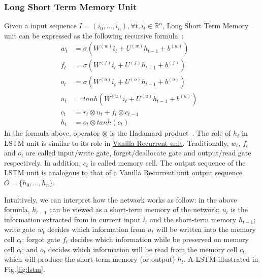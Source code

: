 \subsubsection{Long Short Term Memory Unit}\label{sec:lstm}
Given a input sequence \(I = (i_0,\ldots,i_n), \forall t, i_t \in \mathbb{R}^n\), Long Short Term Memory unit can be expressed as the following recursive formula~\cite{treeLSTM}:
\begin{align}
    w_t &= \sigma(W^{(w)}i_t + U^{(w)}h_{t-1} + b^{(w)}) \label{eq:lstm-input-gate}&\\ 
      f_t &= \sigma(W^{(f)}i_t + U^{(f)}h_{t-1} + b^{(f)}) \label{eq:lstm-forget-gate}&\\ 
      o_t &= \sigma(W^{(o)}i_t + U^{(o)}h_{t-1} + b^{(o)}) \label{eq:lstm-output-gate}&\\ 
      u_t &= tanh(W^{(u)}i_t + U^{(u)}h_{t-1} + b^{(u)}) \label{eq:lstm-update-gate}&\\ 
      c_t &= r_t \otimes u_t + f_t \otimes c_{t-1} \label{eq:longterm-mem}&\\ 
      h_t &= o_t \otimes tanh(c_t) \label{eq:temperal-mem}& 
\end{align}
In the formula above, operator \(\otimes\) is the Hadamard product~\cite{element-prod}.
The role of \(h_t\) in LSTM unit is similar to its role in \hyperref[sec:vanilla-rnn]{Vanilla Recurrent unit}. 
Traditionally, \(w_t\), \(f_t\) and \(o_t\) are called input/write gate, forget/deallocate gate and output/read gate respectively. 
In addition, \(c_t\) is called memory cell. 
The output sequence of the LSTM unit is analogous to that of a Vanilla Recurrent unit output sequence \(O = \{h_0,\ldots,h_n\}\).

Intuitively, we can interpret how the network works as follow: in the above formula, \(h_{t-1}\) can be viewed as a short-term memory of the network; \(u_t\) is the information extracted from in current input \(i_t\) and the short-term memory \(h_{t-1}\); write gate \(w_t\) decides which information from \(u_t\) will be written into the memory cell \(c_t\); forgot gate \(f_t\) decides which information while be preserved on memory cell \(c_t\); and \(o_t\) decides which information will be read from the memory cell \(c_t\), which will produce the short-term memory (or output) \(h_t\). 
A LSTM illustrated in Fig.\ref{fig:lstm}.

